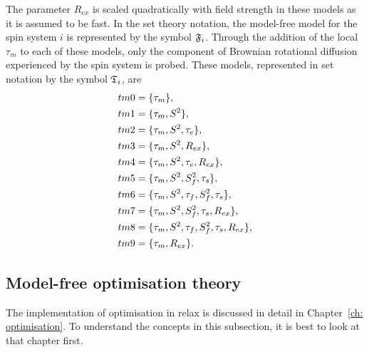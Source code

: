 \begin{htmlonly}
\begin{htmlonly}
\noindent The parameter $R_{ex}$ is scaled quadratically with field strength in these models as it is assumed to be fast.  In the set theory notation, the model-free model for the spin system $i$ is represented by the symbol $\mathfrak{F}_i$.  Through the addition of the local $\tau_m$ to each of these models, only the component of Brownian rotational diffusion experienced by the spin system is probed.  These models, represented in set notation by the symbol $\mathfrak{T}_i$, are
\begin{subequations}
\renewcommand{\theequation}{\theparentequation .\arabic{equation}}
\addtocounter{equation}{-1}
\begin{align}
 tm0 &= \{\tau_m\},                                     \label{model: tm0} \\
 tm1 &= \{\tau_m, S^2\},                                \label{model: tm1} \\
 tm2 &= \{\tau_m, S^2, \tau_e\},                        \label{model: tm2} \\
 tm3 &= \{\tau_m, S^2, R_{ex}\},                        \label{model: tm3} \\
 tm4 &= \{\tau_m, S^2, \tau_e, R_{ex}\},                \label{model: tm4} \\
 tm5 &= \{\tau_m, S^2, S^2_f, \tau_s\},                 \label{model: tm5} \\
 tm6 &= \{\tau_m, S^2, \tau_f, S^2_f, \tau_s\},         \label{model: tm6} \\
 tm7 &= \{\tau_m, S^2, S^2_f, \tau_s, R_{ex}\},         \label{model: tm7} \\
 tm8 &= \{\tau_m, S^2, \tau_f, S^2_f, \tau_s, R_{ex}\}, \label{model: tm8} \\
 tm9 &= \{\tau_m, R_{ex}\}.                             \label{model: tm9}
\end{align}
\end{subequations}





\subsection{Model-free optimisation theory}

The implementation of optimisation in relax is discussed in detail in Chapter~\ref{ch: optimisation}.
To understand the concepts in this subsection, it is best to look at that chapter first.



\end{htmlonly}
\end{htmlonly}
